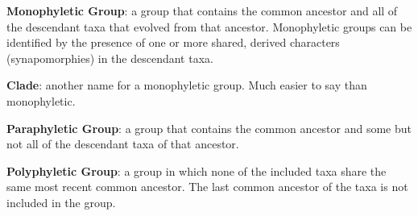 \documentclass[letterpaper]{tufte-handout}
\begin{document}
\textbf{Monophyletic Group}: a group that contains the common ancestor and all of the descendant taxa that evolved from that ancestor. Monophyletic groups can be identified by the presence of one or more shared, derived characters (synapomorphies) in the descendant taxa.

\textbf{Clade}: another name for a monophyletic group.  Much easier to say than monophyletic.

\textbf{Paraphyletic Group}: a group that contains the common ancestor and some but not all of the descendant taxa of that ancestor. 

\textbf{Polyphyletic Group}: a group in which none of the included taxa share the same most recent common ancestor.  The last common ancestor of the taxa is not included in the group.
\end{document}
